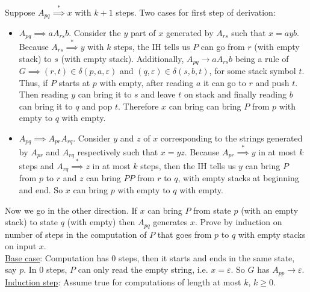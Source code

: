 \documentclass[12 pt]{article}
\begin{document}
Suppose $A_{pq} \stackrel{*}{\implies} x$ with $k+1$ steps. Two cases
for first step of derivation:
\begin{itemize}
\item $A_{pq} \implies a A_{rs}b$. Consider the $y$ part of $x$
  generated by $A_{rs}$ such that $x = ayb$. Because $A_{rs}
  \stackrel{*}{\implies} y$ with $k$ steps, the IH tells us $P$ can go
  from $r$ (with empty stack) to $s$ (with empty stack). Additionally,
  $A_{pq} \to a A_{rs}b$ being a rule of $G \implies
  (r,t) \in \delta(p,a,\varepsilon)$ and $(q,\varepsilon) \in
  \delta(s,b,t)$, for some stack symbol $t$. Thus, if $P$ starts at $p$
  with empty, after reading $a$ it can go to $r$ and push $t$. Then
  reading $y$ can bring it to $s$ and leave $t$ on stack and finally
  reading $b$ can bring it to $q$ and pop $t$. Therefore $x$ can bring
  can bring $P$ from $p$ with empty to $q$ with empty.
\item $A_{pq} \implies A_{pr}A_{rq}$. Consider $y$ and $z$ of $x$
  corresponding to the strings generated by $A_{pr}$ and $A_{rq}$
  respectively such that $x=yz$. Because $A_{pr}
  \stackrel{*}{\implies} y$ in at most $k$ steps and $A_{rq}
  \stackrel{*}{\implies} z$ in at most $k$ steps, then the IH tells us
  $y$ can bring $P$ from $p$ to $r$ and $z$ can bring $PP$ from $r$ to
  $q$, with empty stacks at beginning and end. So $x$ can bring $p$
  with empty to $q$ with empty.
\end{itemize}
Now we go in the other direction. If $x$ can bring $P$ from state $p$
(with an empty stack) to state $q$ (with empty) then $A_{pq}$
generates $x$. Prove by induction on number of steps in the
computation of $P$ that goes from $p$ to $q$ with empty stacks on
input $x$.
\\ \underline{Base case}: Computation has $0$ steps, then it starts
and ends in the same state, say $p$. In $0$ steps, $P$ can only read
the empty string, i.e. $x = \varepsilon$. So $G$ has $A_{pp} \to \varepsilon$.
\\ \underline{Induction step}: Assume true for computations of length
at most $k$, $k \geq 0$.
\end{document}
